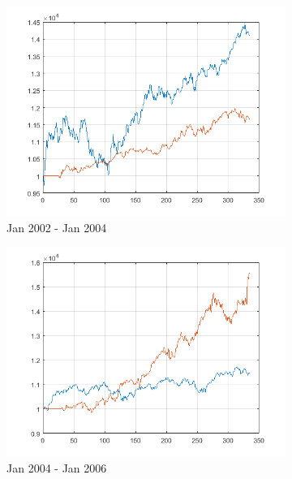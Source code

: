 \documentclass[11pt,a4,twosided,singlespacing,titlepagenumber=on]{scrreprt}
\numberwithin{equation}{chapter} %
\theoremstyle{remark}
\begin{document}
\begin{figure}[H]
\begin{subfigure}[t]{0.32\textwidth}
        \includegraphics[width=1\textwidth]{res/backtest_cpx/7}
        \caption{Jan 2002 - Jan 2004}
    \end{subfigure}
    \begin{subfigure}[t]{0.32\textwidth}
        \centering
        \includegraphics[width=1\textwidth]{res/backtest_cpx/8}
        \caption{Jan 2004 - Jan 2006}
    \end{subfigure}
    \begin{subfigure}[t]{0.32\textwidth}
        \centering

\end{subfigure}
\end{figure}
\end{document}
